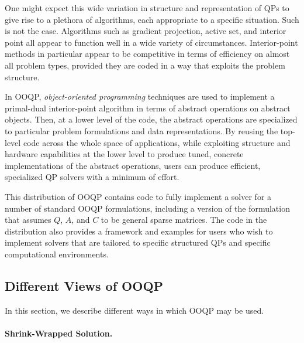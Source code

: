 One might expect this wide variation in structure and representation of
QPs to give rise to a plethora of algorithms, each appropriate to a
specific situation.  Such is not the case.  Algorithms such as
gradient projection, active set, and interior point all appear to
function well in a wide variety of circumstances.  Interior-point
methods in particular appear to be competitive in terms of efficiency
on almost all problem types, provided they are coded in a way that
exploits the problem structure.

In OOQP, {\em object-oriented programming} techniques are used to
implement a primal-dual interior-point algorithm in terms of abstract
operations on abstract objects.  Then, at a lower level of the code,
the abstract operations are specialized to particular problem
formulations and data representations. By reusing the top-level code
across the whole space of applications, while exploiting structure and
hardware capabilities at the lower level to produce tuned, concrete
implementations of the abstract operations, users can produce
efficient, specialized QP solvers with a minimum of effort.

This distribution of OOQP contains code to fully implement a solver
for a number of standard OOQP formulations, including a version of the
formulation  that assumes $Q$, $A$, and $C$ to be general
sparse matrices. The code in the distribution also provides a
framework and examples for users who wish to implement solvers that
are tailored to specific structured QPs and specific computational
environments.

\subsection{Different Views of OOQP}

In this section, we describe different ways in which OOQP may be used.

\paragraph{Shrink-Wrapped Solution.} 

